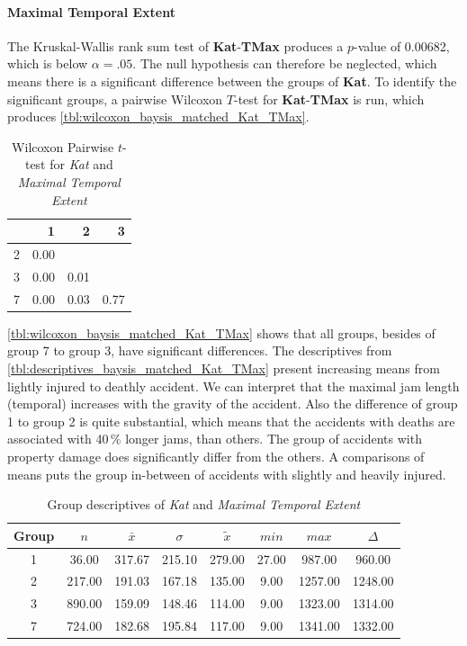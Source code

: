 \paragraph{Maximal Temporal Extent}
The Kruskal-Wallis rank sum test of \textbf{Kat}-\textbf{TMax} produces a $p$-value of 0.00682, which is below $\alpha=.05$. The null hypothesis can therefore be neglected, which means there is a significant difference between the groups of \textbf{Kat}. To identify the significant groups, a pairwise Wilcoxon $T$-test for \textbf{Kat}-\textbf{TMax} is run, which produces \autoref{tbl:wilcoxon_baysis_matched_Kat_TMax}.
\begin{table}[ht]
	\small
	\centering
	\begin{tabular}{rrrr}
	  	\toprule
	 	& 1 & 2 & 3 \\ 
	  	\midrule
		2 & 0.00 &  &  \\ 
	  	3 & 0.00 & 0.01 &  \\ 
	  	7 & 0.00 & 0.03 & 0.77 \\ 
	   	\bottomrule
	\end{tabular}
	\caption{Wilcoxon Pairwise $t$-test for \textit{Kat} and \textit{Maximal Temporal Extent}}
	\label{tbl:wilcoxon_baysis_matched_Kat_TMax}
\end{table}
\autoref{tbl:wilcoxon_baysis_matched_Kat_TMax} shows that all groups, besides of group 7 to group 3, have significant differences. The descriptives from \autoref{tbl:descriptives_baysis_matched_Kat_TMax} present increasing means from lightly injured to deathly accident. We can interpret that the maximal jam length (temporal) increases with the gravity of the accident. Also the difference of group 1 to group 2 is quite substantial, which means that the accidents with deaths are associated with 40\,\% longer jams, than others. The group of accidents with property damage does significantly differ from the others. A comparisons of means puts the group in-between of accidents with slightly and heavily injured.
\begin{table}[ht]
	\small
	\centering
	\begin{tabular}{c|c|c|c|c|c|c|c}
		\toprule
		Group & $n$ & $\bar{x}$ & $\sigma$ & $\tilde{x}$ & $min$ & $max$ & $\Delta$ \\   
	  	\midrule
		1 & 36.00 & 317.67 & 215.10 & 279.00   & 27.00 & 987.00 & 960.00  \\ 
	  	2 & 217.00 & 191.03 & 167.18 & 135.00 & 9.00 & 1257.00 & 1248.00  \\ 
	  	3 & 890.00 & 159.09 & 148.46 & 114.00 & 9.00 & 1323.00 & 1314.00  \\ 
	  	7 & 724.00 & 182.68 & 195.84 & 117.00  & 9.00 & 1341.00 & 1332.00 \\ 
	   	\bottomrule
	\end{tabular}
	\caption{Group descriptives of \textit{Kat} and \textit{Maximal Temporal Extent}}
	\label{tbl:descriptives_baysis_matched_Kat_TMax}
\end{table}

